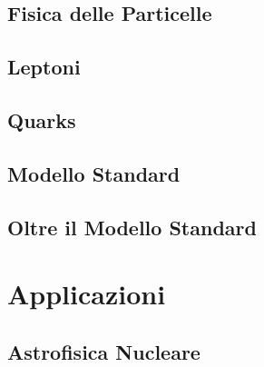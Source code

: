 \documentclass[a4paper, 12pt, openany]{book}
\begin{document}
\chapter{Fisica delle Particelle}


\chapter{Leptoni}


\chapter{Quarks}


\chapter{Modello Standard}


\chapter{Oltre il Modello Standard}


\part{Applicazioni}
\pagestyle{body}

\chapter{Astrofisica Nucleare}

\end{document}
